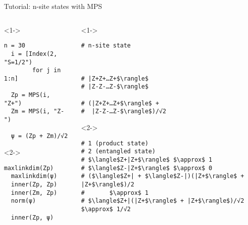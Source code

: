 \begin{frame}[fragile]{Tutorial: n-site states with MPS}


\begin{columns}

\begin{column}{4.5cm}

\begin{onlyenv}<1->

\begin{lstlisting}[language=JuliaLocal, style=julia, mathescape, basicstyle=\small]
  n = 30
  i = [Index(2, "S=1/2")
        for j in 1:n]

  Zp = MPS(i, "Z+")
  Zm = MPS(i, "Z-")

  ψ = (Zp + Zm)/√2
 \end{lstlisting}

\end{onlyenv}

\begin{onlyenv}<2->

\begin{lstlisting}[language=JuliaLocal, style=julia, mathescape, basicstyle=\small]
  maxlinkdim(Zp)
  maxlinkdim(ψ)
  inner(Zp, Zp)
  inner(Zm, Zp)
  norm(ψ)

  inner(Zp, ψ)
\end{lstlisting}

\end{onlyenv}

\end{column}

\begin{column}{5.5cm}

\begin{onlyenv}<1->

\begin{lstlisting}[style=julia, numbers=none, mathescape, basicstyle=\small]
# n-site state



# |Z+Z+…Z+$\rangle$
# |Z-Z-…Z-$\rangle$

# (|Z+Z+…Z+$\rangle$ +
#  |Z-Z-…Z-$\rangle$)/√2
\end{lstlisting}

\end{onlyenv}

\begin{onlyenv}<2->

\begin{lstlisting}[style=julia, numbers=none, mathescape, basicstyle=\small]
# 1 (product state)
# 2 (entangled state)
# $\langle$Z+|Z+$\rangle$ $\approx$ 1
# $\langle$Z-|Z+$\rangle$ $\approx$ 0
# ($\langle$Z+| + $\langle$Z-|)(|Z+$\rangle$ + |Z+$\rangle$)/2
#       $\approx$ 1
# $\langle$Z+|(|Z+$\rangle$ + |Z+$\rangle$)/√2 $\approx$ 1/√2
\end{lstlisting}

\end{onlyenv}

\end{column}

\end{columns}

\end{frame}
